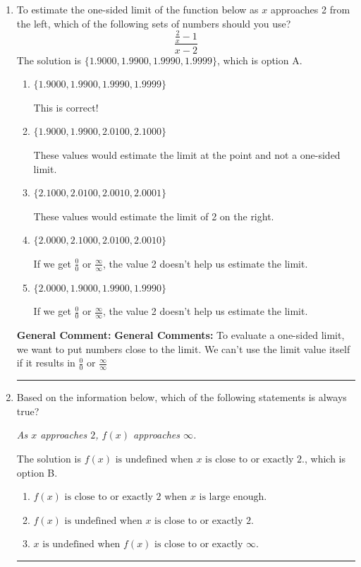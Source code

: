 \documentclass{extbook}[14pt]
\newcommand{\litem}[1]{\item #1

\rule{\textwidth}{0.4pt}}
\begin{document}
\begin{enumerate}\litem{
To estimate the one-sided limit of the function below as $x$ approaches 2 from the left, which of the following sets of numbers should you use?
\[ \frac{\frac{2}{x} - 1}{x - 2} \]The solution is \( \{ 1.9000, 1.9900, 1.9990, 1.9999 \} \), which is option A.\begin{enumerate}[label=\Alph*.]
\item \( \{ 1.9000, 1.9900, 1.9990, 1.9999 \} \)

This is correct!
\item \( \{ 1.9000, 1.9900, 2.0100, 2.1000 \} \)

These values would estimate the limit at the point and not a one-sided limit.
\item \( \{ 2.1000, 2.0100, 2.0010, 2.0001 \} \)

These values would estimate the limit of 2 on the right.
\item \( \{ 2.0000, 2.1000, 2.0100, 2.0010 \} \)

If we get $\frac{0}{0}$ or $\frac{\infty}{\infty}$, the value 2 doesn't help us estimate the limit.
\item \( \{ 2.0000, 1.9000, 1.9900, 1.9990 \} \)

If we get $\frac{0}{0}$ or $\frac{\infty}{\infty}$, the value 2 doesn't help us estimate the limit.
\end{enumerate}

\textbf{General Comment:} \textbf{General Comments:} To evaluate a one-sided limit, we want to put numbers close to the limit. We can't use the limit value itself if it results in $\frac{0}{0}$ or $\frac{\infty}{\infty}$
}
\litem{
Based on the information below, which of the following statements is always true?

\begin{center}
    \textit{ As $x$ approaches $2$, $f(x)$ approaches $\infty$. }
\end{center}
The solution is \( f(x) \text{ is undefined when } x \text{ is close to or exactly } 2. \), which is option B.\begin{enumerate}[label=\Alph*.]
\item \( f(x) \text{ is close to or exactly } 2 \text{ when } x \text{ is large enough}. \)


\item \( f(x) \text{ is undefined when } x \text{ is close to or exactly } 2. \)


\item \( x \text{ is undefined when } f(x) \text{ is close to or exactly } \infty. \)



\end{enumerate}}
\end{enumerate}
\end{document}
